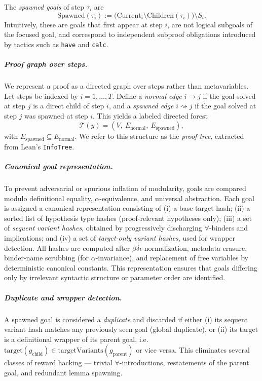 \begin{definition}\label{def:spawned}
The \emph{spawned goals} of step $\tau_i$ are
\[
\mathrm{Spawned}(\tau_i) := \bigl(\mathrm{Current}_i \setminus \mathrm{Children}(\tau_i)\bigr) \setminus S_i.
\]
Intuitively, these are goals that first appear at step $i$, are not logical subgoals of the focused goal, and correspond to independent subproof obligations introduced by tactics such as \texttt{have} and \texttt{calc}.
\end{definition}

\subparagraph{Proof graph over steps.} We represent a proof as a directed graph over steps rather than metavariables. Let steps be indexed by $i = 1,\dots,T$. Define a \emph{normal edge} $i \to j$ if the goal solved at step $j$ is a direct child of step $i$, and a \emph{spawned edge} $i \rightsquigarrow j$ if the goal solved at step $j$ was spawned at step $i$. This yields a labeled directed forest
\[
\mathcal{T}(y) = (V,\ E_{\mathrm{normal}},\ E_{\mathrm{spawned}}),
\]
with $E_{\mathrm{spawned}} \subseteq E_{\mathrm{normal}}$. We refer to this structure as the \emph{proof tree}, extracted from Lean's \texttt{InfoTree}.

\subparagraph{Canonical goal representation.} To prevent adversarial or spurious inflation of modularity, goals are compared modulo definitional equality, $\alpha$-equivalence, and universal abstraction. Each goal is assigned a canonical representation consisting of (i) a base target hash; (ii) a sorted list of hypothesis type hashes (proof-relevant hypotheses only); (iii) a set of \emph{sequent variant hashes}, obtained by progressively discharging $\forall$-binders and implications; and (iv) a set of \emph{target-only variant hashes}, used for wrapper detection. All hashes are computed after $\beta\delta\iota$-normalization, metadata erasure, binder-name scrubbing (for $\alpha$-invariance), and replacement of free variables by deterministic canonical constants. This representation ensures that goals differing only by irrelevant syntactic structure or parameter order are identified.

\subparagraph{Duplicate and wrapper detection.} A spawned goal is considered a \emph{duplicate} and discarded if either (i) its sequent variant hash matches any previously seen goal (global duplicate), or (ii) its target is a definitional wrapper of its parent goal, i.e.\ $\mathrm{target}(g_{\mathrm{child}}) \in \mathrm{targetVariants}(g_{\mathrm{parent}})$ or vice versa. This eliminates several classes of reward hacking --- trivial $\forall$-introductions, restatements of the parent goal, and redundant lemma spawning.

